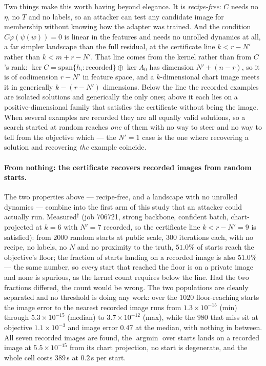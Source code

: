 Two things make this worth having beyond elegance. It is \emph{recipe-free}:
$C$ needs no $\eta$, no $T$ and no labels, so an attacker can test any
candidate image for membership without knowing how the adapter was trained.
And the condition $C\varphi(\psi(w))=0$ is linear in the features and needs
no unrolled dynamics at all, a far simpler landscape than the full residual,
at the certificate line $k<r-N'$ rather than $k<m+r-N'$. That line comes from
the kernel rather than from $C$'s rank: $\ker C=\mathrm{span}\{h_i:\text{recorded}\}
\oplus\ker A_0$ has dimension $N'+(n-r)$, so it is of codimension $r-N'$ in
feature space, and a $k$-dimensional chart image meets it in generically
$k-(r-N')$ dimensions. Below the line the recorded examples are isolated
solutions and generically the only ones; above it each lies on a
positive-dimensional family that satisfies the certificate without being the
image. When several examples are recorded they are all equally valid
solutions, so a search started at random reaches \emph{one} of them with no
way to steer and no way to tell from the objective which — the $N'=1$ case is
the one where recovering a solution and recovering \emph{the} example
coincide.
\paragraph{From nothing: the certificate recovers recorded images from random
starts.} The two properties above --- recipe-free, and a landscape with no
unrolled dynamics --- combine into the first arm of this study that an
attacker could actually run. Measured$^\dagger$ (job 706721, strong backbone,
confident batch, chart-projected at $k=6$ with $N'=7$ recorded, so the
certificate line $k<r-N'=9$ is satisfied): from $2000$ random starts at public
scale, $300$ iterations each, with no recipe, no labels, no $N$ and no
proximity to the truth, $51.0\%$ of starts reach the objective's floor; the
fraction of starts landing on a recorded image is also $51.0\%$ --- the same
number, so \emph{every} start that reached the floor is on a private image and
none is spurious, as the kernel count requires below the line. Had the two
fractions differed, the count would be wrong. The two populations are cleanly
separated and no threshold is doing any work: over the $1020$ floor-reaching
starts the image error to the nearest recorded image runs from
$1.3\times10^{-15}$ (min) through $5.3\times10^{-15}$ (median) to
$3.7\times10^{-12}$ (max), while the $980$ that miss sit at objective
$1.1\times10^{-3}$ and image error $0.47$ at the median, with nothing in
between. All seven recorded images are found, the $\operatorname{argmin}$ over
starts lands on a recorded image at $5.5\times10^{-15}$ from its chart
projection, no start is degenerate, and the whole cell costs $389$\,s at
$0.2$\,s per start.

